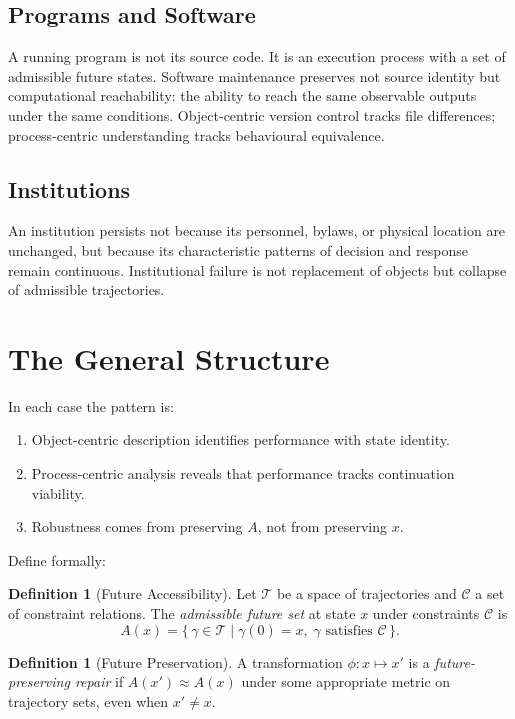 \documentclass[11pt, a4paper, openany]{book}
\theoremstyle{plain}
\theoremstyle{definition}
\newtheorem{definition}[theorem]{Definition}
\theoremstyle{remark}
\begin{document}
\subsection{Programs and Software}

A running program is not its source code.
It is an execution process with a set of admissible future states.
Software maintenance preserves not source identity but computational reachability:
the ability to reach the same observable outputs under the same conditions.
Object-centric version control tracks file differences;
process-centric understanding tracks behavioural equivalence.

\subsection{Institutions}

An institution persists not because its personnel, bylaws, or physical location
are unchanged, but because its characteristic patterns of decision and response
remain continuous.
Institutional failure is not replacement of objects but collapse of
admissible trajectories.

\section{The General Structure}

In each case the pattern is:
\begin{enumerate}
  \item Object-centric description identifies performance with state identity.
  \item Process-centric analysis reveals that performance tracks continuation viability.
  \item Robustness comes from preserving $A$, not from preserving $x$.
\end{enumerate}

Define formally:

\begin{definition}[Future Accessibility]
  Let $\mathcal{T}$ be a space of trajectories and $\mathcal{C}$ a set of
  constraint relations.
  The \emph{admissible future set} at state $x$ under constraints $\mathcal{C}$
  is
  \[
    A(x) = \bigl\{\, \gamma \in \mathcal{T} \;\big|\; \gamma(0) = x,\;
    \gamma \text{ satisfies } \mathcal{C} \,\bigr\}.
  \]
\end{definition}

\begin{definition}[Future Preservation]
  A transformation $\phi : x \mapsto x'$ is a \emph{future-preserving repair}
  if $A(x') \approx A(x)$ under some appropriate metric on trajectory sets,
  even when $x' \neq x$.
\end{definition}
\end{document}
